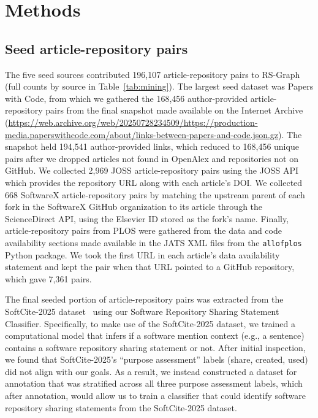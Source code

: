 \documentclass[pdflatex,sn-nature]{sn-jnl}%
\begin{document}
\section{Methods}\label{sec:methods}

\subsection{Seed article-repository pairs}\label{subsec:m-seeds}

The five seed sources contributed 196,107 article-repository pairs to RS-Graph (full counts by source in Table~\ref{tab:mining}).
The largest seed dataset was Papers with Code, from which we gathered the 168,456 author-provided article-repository pairs from the final snapshot made available on the Internet Archive (\url{https://web.archive.org/web/20250728234509/https://production-media.paperswithcode.com/about/links-between-papers-and-code.json.gz}).
The snapshot held 194,541 author-provided links, which reduced to 168,456 unique pairs after we dropped articles not found in OpenAlex and repositories not on GitHub.
We collected 2,969 JOSS article-repository pairs using the JOSS API which provides the repository URL along with each article's DOI.
We collected 668 SoftwareX article-repository pairs by matching the upstream parent of each fork in the SoftwareX GitHub organization to its article through the ScienceDirect API, using the Elsevier ID stored as the fork's name.
Finally, article-repository pairs from PLOS were gathered from the data and code availability sections made available in the JATS XML files from the \texttt{allofplos} Python package.
We took the first URL in each article's data availability statement and kept the pair when that URL pointed to a GitHub repository, which gave 7,361 pairs.

The final seeded portion of article-repository pairs was extracted from the SoftCite-2025 dataset~\cite{howison_2025_15149379} using our Software Repository Sharing Statement Classifier.
Specifically, to make use of the SoftCite-2025 dataset, we trained a computational model that infers if a software mention context (e.g., a sentence) contains a software repository sharing statement or not.
After initial inspection, we found that SoftCite-2025's ``purpose assessment'' labels (share, created, used) did not align with our goals.
As a result, we instead constructed a dataset for annotation that was stratified across all three purpose assessment labels, which after annotation, would allow us to train a classifier that could identify software repository sharing statements from the SoftCite-2025 dataset.
\end{document}
